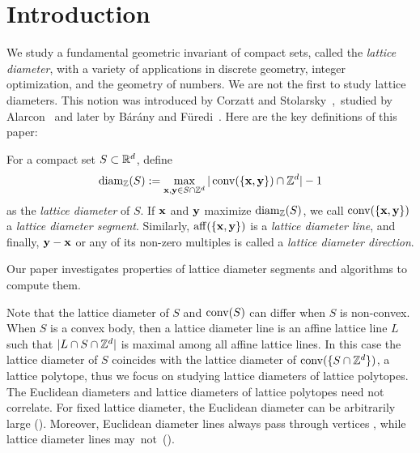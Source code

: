 \section{Introduction}  

We study a fundamental geometric invariant of compact sets, called the \textit{lattice diameter}, with a variety of applications in discrete geometry, integer optimization, and the geometry of numbers. We are not the first to study lattice diameters.
This notion was introduced by Corzatt and \mbox{Stolarsky~\cite{Corzatt_PhD}, 
studied} by Alarcon~\cite{Alarcon_PhD} and later by Bárány and Füredi~\cite{Barany_Furedi}. Here are the key definitions of this paper: 

\begin{definition}\label{def:ld-non-convex}
    For a compact set $S \subset \mathbb{R}^d$, define $$\operatorname{diam_{\mathbb{Z}}}(S):=\max_{\mathbf{x},\mathbf{y} \in S \cap \mathbb{Z}^d} |\operatorname{conv}(\{\mathbf{x},\mathbf{y}\}) \cap \mathbb{Z}^d|-1$$
    as the \emph{lattice diameter} of $S$. If $\mathbf{x}$ and $\mathbf{y}$ maximize $\operatorname{diam_{\mathbb{Z}}}(S)$, we call $\operatorname{conv}(\{\mathbf{x},\mathbf{y}\})$ a \emph{lattice diameter segment}. Similarly, $\operatorname{aff}(\{\mathbf{x},\mathbf{y}\})$ is a \emph{lattice diameter line}, and finally, $\mathbf{y}-\mathbf{x}$ or any of its non-zero multiples is called a \emph{lattice diameter direction}. 
\end{definition}

Our paper investigates properties of lattice diameter segments and algorithms to compute them.

Note that the lattice diameter of $S$ and $\operatorname{conv}(S)$ can differ when $S$ is non-convex. When $S$ is a convex body, then a lattice diameter line is an affine lattice line $L$ such that $|L \cap S \cap \mathbb{Z}^d|$ is maximal among all affine lattice lines. In this case the lattice diameter of $S$ coincides with the lattice diameter of $\operatorname{conv}(\{S \cap \mathbb{Z}^d\})$, a lattice polytope, thus we focus on studying lattice diameters of lattice polytopes. The Euclidean diameters and lattice diameters of lattice polytopes need not correlate. For fixed lattice diameter, the Euclidean diameter can be arbitrarily large (). Moreover, Euclidean diameter lines always pass through vertices \cite[Lemma~1.7]{GritzmannKlee1992}, while lattice diameter lines \mbox{may not ().}


